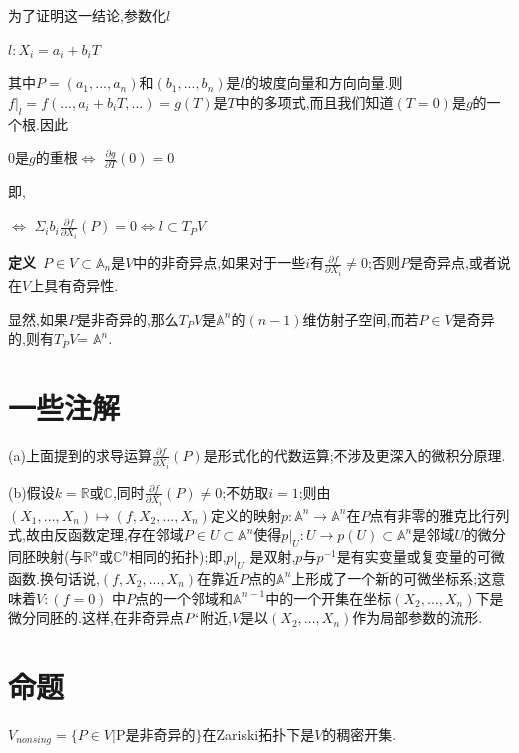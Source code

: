 \documentclass[UTF8]{book}
\begin{document}
为了证明这一结论,参数化$ l $


\begin{center}
	$l:X_{i}=a_{i}+b_{i}T$
\end{center}


其中$P=(a_{1},...,a_{n})$和$(b_{1},...,b_{n})$是$ l $的坡度向量和方向向量.则$f|_{l}=f(...,a_{i}+b_{i}T,...)=g(T)$是$ T $中的多项式,而且我们知道$ (T=0) $是$ g $的一个根.因此


\begin{center}
	0是$ g $的重根$\iff$ $\frac{\partial g}{\partial T}(0)=0$
\end{center}


即,


\begin{center}
	$\iff$ $\Sigma_{i}b_{i}\frac{\partial f}{\partial X_{i}}(P)=0 \iff l\subset T_{P}V$
\end{center}


\textbf{定义}\ $P\in V \subset \mathbb{A}_{n}$是$ V $中的非奇异点,如果对于一些$ i $有$\frac{\partial f}{\partial X_{i}}\ne 0$;否则$ P $是奇异点,或者说在$ V $上具有奇异性.


显然,如果$ P $是非奇异的,那么$T_{P}V$是$\mathbb{A}^{n}$的$ (n-1) $维仿射子空间,而若$P\in V$是奇异的,则有$T_{P}V$= $\mathbb{A}^{n}$.


\section{一些注解}
(a)上面提到的求导运算$\frac{\partial f}{\partial X_{i}}(P)$是形式化的代数运算;不涉及更深入的微积分原理.


(b)假设$k=\mathbb{R}$或$\mathbb{C}$,同时$\frac{\partial f}{\partial X_{i}}(P)\ne 0$;不妨取$i=1$;则由$(X_{1},...,X_{n})\mapsto (f,X_{2},...,X_{n})$定义的映射$p:\mathbb{A}^{n} \longrightarrow \mathbb{A}^{n}$在$ P $点有非零的雅克比行列式,故由反函数定理,存在邻域$P\in U \subset \mathbb{A}^{n}$使得$p|_{U}: U\rightarrow p(U)\subset \mathbb{A}^{n}$是邻域$ U $的微分同胚映射(与$\mathbb{R}^{n}$或$\mathbb{C}^{n}$相同的拓扑);即,$p|_{U}$ 是双射,$ p $与$p^{-1}$是有实变量或复变量的可微函数.换句话说,$(f,X_{2},...,X_{n})$在靠近$ P $点的$\mathbb{A}^{n}$上形成了一个新的可微坐标系;这意味着$V:(f=0)$ 中$ P $点的一个邻域和$\mathbb{A}^{n-1}$中的一个开集在坐标$(X_{2},...,X_{n})$下是微分同胚的.这样,在非奇异点$ P` $附近,$ V $是以$(X_{2},...,X_{n})$作为局部参数的流形.


\section{命题}
$V_{nonsing}=\{P\in V |$P是非奇异的$\}$在Zariski拓扑下是$ V $的稠密开集.
\end{document}
